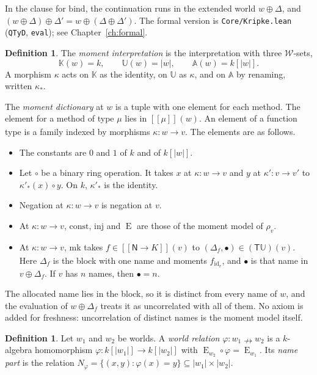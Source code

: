 \documentclass[11pt,a4paper]{report}
\theoremstyle{plain}
\theoremstyle{definition}
\newtheorem{definition}[theorem]{Definition}
\theoremstyle{remark}
\newcommand{\E}{\operatorname{E}}
\newcommand{\sK}{\mathbb{K}}
\newcommand{\sU}{\mathbb{U}}
\newcommand{\sA}{\mathbb{A}}
\newcommand{\T}{\mathsf{T}}
\newcommand{\Nat}{\mathsf{N}}
\newcommand{\W}{\mathcal{W}}
\newcommand{\mk}{\mathrm{mk}}
\newcommand{\den}[2]{[\![#1]\!]_{#2}}
\begin{document}
In the clause for $\mathrm{bind}$, the continuation runs in the extended world
$w \oplus \Delta$, and $(w \oplus \Delta) \oplus \Delta' = w \oplus (\Delta \oplus
\Delta')$. The formal version is \texttt{Core/Kripke.lean} (\texttt{QTyD},
\texttt{eval}); see Chapter~\ref{ch:formal}.

\begin{definition}
\label{def:momentdict}
The \emph{moment interpretation} is the interpretation with three $\W$-sets,
\[
  \sK(w) = k , \qquad \sU(w) = |w| , \qquad \sA(w) = k[|w|] .
\]
A morphism $\kappa$ acts on $\sK$ as the identity, on $\sU$ as $\kappa$, and on
$\sA$ by renaming, written $\kappa_*$.

The \emph{moment dictionary} at $w$ is a tuple with one element for each method.
The element for a method of type $\mu$ lies in $\den{\mu}{}(w)$. An element of a
function type is a family indexed by morphisms $\kappa : w \to v$. The elements
are as follows.
\begin{itemize}
\item The constants are $0$ and $1$ of $k$ and of $k[|w|]$.
\item Let $\circ$ be a binary ring operation. It takes $x$ at $\kappa : w \to v$
  and $y$ at $\kappa' : v \to v'$ to $\kappa'_*(x) \circ y$. On $k$, $\kappa'_*$ is
  the identity.
\item Negation at $\kappa : w \to v$ is negation at $v$.
\item At $\kappa : w \to v$, $\mathrm{const}$, $\mathrm{inj}$ and $\E$ are those of
  the moment model of $\rho_v$.
\item At $\kappa : w \to v$, $\mk$ takes $f \in \den{\Nat \to K}{}(v)$ to
  $(\Delta_f, \bullet) \in (\T \sU)(v)$. Here $\Delta_f$ is the block with one
  name and moments $f_{\mathrm{id}_v}$, and $\bullet$ is that name in
  $v \oplus \Delta_f$. If $v$ has $n$ names, then $\bullet = n$.
\end{itemize}
\end{definition}

The allocated name lies in the block, so it is distinct from every name of $w$,
and the evaluation of $w \oplus \Delta_f$ treats it as uncorrelated with all of
them. No axiom is added for freshness: uncorrelation of distinct names is the
moment model itself.

\begin{definition}
\label{def:worldrel}
Let $w_1$ and $w_2$ be worlds. A \emph{world relation}
$\varphi : w_1 \nrightarrow w_2$ is a $k$-algebra homomorphism
$\varphi : k[|w_1|] \to k[|w_2|]$ with $\E_{w_2} \circ \varphi = \E_{w_1}$. Its
\emph{name part} is the relation
$N_\varphi = \{(x, y) : \varphi(x) = y\} \subseteq |w_1| \times |w_2|$.
\end{definition}
\end{document}
